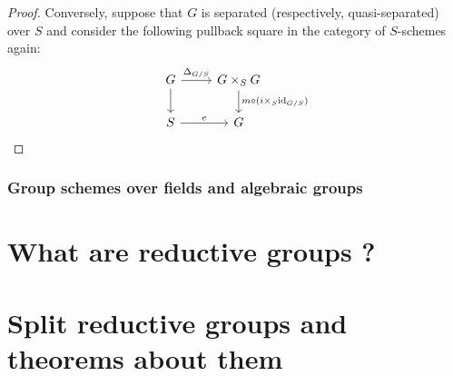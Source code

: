 \begin{proof}
                        Conversely, suppose that $G$ is separated (respectively, quasi-separated) over $S$ and consider the following pullback square in the category of $S$-schemes again:
                            $$
                                \begin{tikzcd}
                                	G & {G \x_S G} \\
                                	S & G
                                	\arrow["{\Delta_{G/S}}", from=1-1, to=1-2]
                                	\arrow["e", from=2-1, to=2-2]
                                	\arrow[from=1-1, to=2-1]
                                	\arrow["{m \circ (i \x_S \id_{G/S})}", from=1-2, to=2-2]
                                \end{tikzcd}
                            $$
                        
                    \end{proof}
            
            \subsubsection{Group schemes over fields and algebraic groups}
    
    \section{What are reductive groups ?}
    
    \section{Split reductive groups and theorems about them}